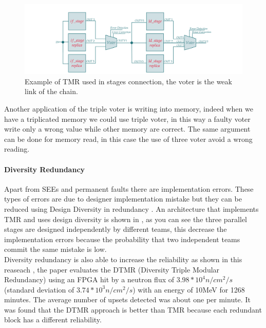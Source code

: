 {{{{{            		\begin{figure}[H]
            			\centering
            			\includegraphics[scale=0.2,center]{./images/TMR_tripleVoter3.png}
            			\caption{Example of TMR used in stages connection, the voter is the weak link of the chain.}
            			\label{fig:TMR4}
            		\end{figure} 
            		
            		Another application of the triple voter is writing into memory, indeed when we have a triplicated memory we could use triple voter, in this way a faulty voter write only a wrong value while other memory are correct. The same argument can be done for memory read, in this case the use of three voter avoid a wrong reading. 
        		}
        		\paragraph{Diversity Redundancy}{
        		    Apart from SEEs and permanent faults there are implementation errors. These types of errors are due to designer implementation mistake but they can be reduced using Design Diversity in redundancy . An architecture that implements TMR and uses design diversity is shown in , as you can see the three parallel stages are designed independently by different teams, this decrease the implementation errors because the probability that two independent teams commit the same mistake is low. \\
        		    
        		    
                	Diversity redundancy is also able to increase the reliability as shown in this reaseach , the paper evaluates the DTMR (Diversity Triple Modular Redundancy) using an FPGA hit by a neutron flux of $3.98*10^4 n/cm^2/s$ (standard deviation of $3.74*10^3 n/cm^2/s$) with an energy of 10MeV for 1268 minutes. 
                	The average number of upsets detected was about one per minute. It was found that the DTMR approach is better than TMR because each redundant block has a different reliability.\\
        		    
}}}}}
